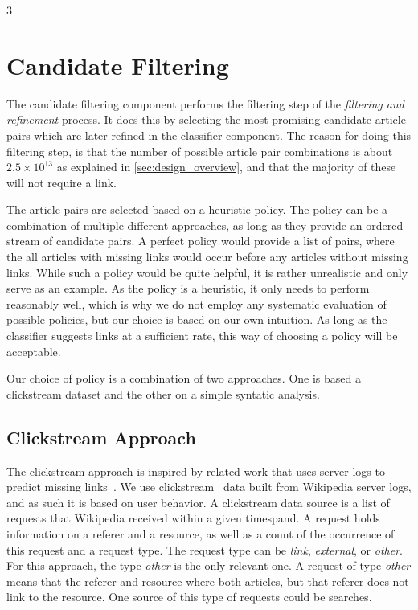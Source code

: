 3\section{Candidate Filtering}
The candidate filtering component performs the filtering step of the \emph{filtering and refinement} process. It does this by selecting the most promising candidate article pairs which are later refined in the classifier component. The reason for doing this filtering step, is that the number of possible article pair combinations is about $2.5 \times 10^{13}$ as explained in \cref{sec:design_overview}, and that the majority of these will not require a link.

The article pairs are selected based on a heuristic policy. The policy can be a combination of multiple different approaches, as long as they provide an ordered stream of candidate pairs. A perfect policy would provide a list of pairs, where the all articles with missing links would occur before any articles without missing links. While such a policy would be quite helpful, it is rather unrealistic and only serve as an example. As the policy is a heuristic, it only needs to perform reasonably well, which is why we do not employ any systematic evaluation of possible policies, but our choice is based on our own intuition. As long as the classifier suggests links at a sufficient rate, this way of choosing a policy will be acceptable.

Our choice of policy is a combination of two approaches. One is based a clickstream dataset and the other on a simple syntatic analysis.

\subsection{Clickstream Approach}

The clickstream approach is inspired by related work that uses server logs to predict missing links~\cite{hyperlink-structure-using-logs}. We use clickstream~\cite{wiki-clickstream} data built from Wikipedia server logs, and as such it is based on user behavior. A clickstream data source is a list of requests that Wikipedia received within a given timespand. A request holds information on a referer and a resource, as well as a count of the occurrence of this request and a request type. The request type can be \emph{link}, \emph{external}, or \emph{other}. For this approach, the type \emph{other} is the only relevant one. A request of type \emph{other} means that the referer and resource where both articles, but that referer does not link to the resource. One source of this type of requests could be searches.

